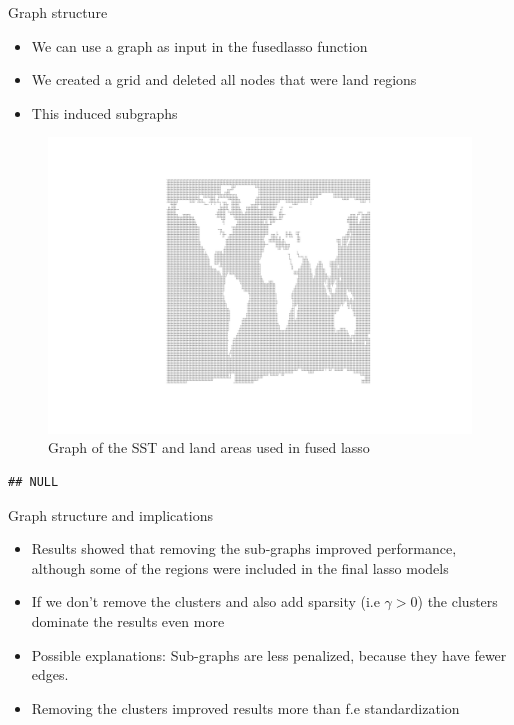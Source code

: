 \documentclass[
  ignorenonframetext,
]{beamer}
\providecommand{\tightlist}{%
  \setlength{\itemsep}{0pt}\setlength{\parskip}{0pt}}
\begin{document}
\begin{frame}[fragile]{Graph structure}
\protect\hypertarget{graph-structure}{}
\begin{itemize}
\tightlist
\item
  We can use a graph as input in the fusedlasso function
\item
  We created a grid and deleted all nodes that were land regions
\item
  This induced subgraphs
\end{itemize}

\begin{figure}

{\centering \includegraphics[width=0.75\linewidth]{ma-presentation_files/figure-beamer/graph-plot2-1} 

}

\caption{Graph of the SST and land areas used in fused lasso}\label{fig:graph-plot2}
\end{figure}

\begin{verbatim}
## NULL
\end{verbatim}
\end{frame}

\begin{frame}{Graph structure and implications}
\protect\hypertarget{graph-structure-and-implications}{}
\begin{itemize}
\tightlist
\item
  Results showed that removing the sub-graphs improved performance,
  although some of the regions were included in the final lasso models
\item
  If we don't remove the clusters and also add sparsity (i.e
  \(\gamma > 0\)) the clusters dominate the results even more
\item
  Possible explanations: Sub-graphs are less penalized, because they
  have fewer edges.
\item
  Removing the clusters improved results more than f.e standardization
\end{itemize}
\end{frame}
\end{document}
